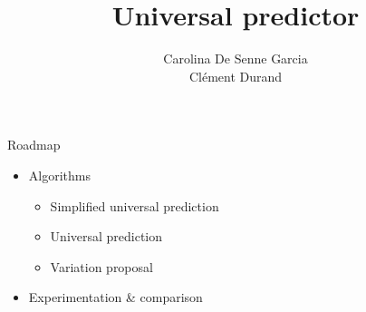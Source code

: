 \documentclass[aspectratio=169]{beamer}
\title[Pattern-based prediction algorithms, applications and variations]
      {Universal predictor}
\author{%
  Carolina De Senne Garcia\\%
  Clément Durand%
}
\begin{document}
\maketitle

\begin{frame}{Roadmap}\Large
  \begin{itemize}
    \item Algorithms
      \begin{itemize}
        \item Simplified universal prediction
        \item Universal prediction
        \item Variation proposal
      \end{itemize}
    \item Experimentation \& comparison
  \end{itemize}
\end{frame}





\end{document}
